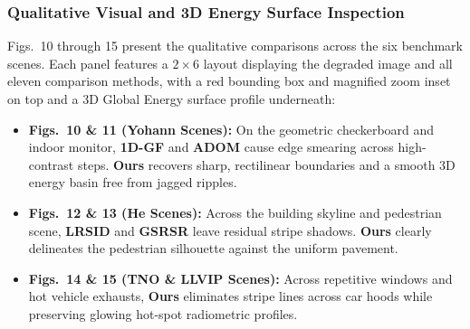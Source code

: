 \subsubsection{Qualitative Visual and 3D Energy Surface Inspection}
Figs.~10 through 15 present the qualitative comparisons across the six benchmark scenes. Each panel features a $2 \times 6$ layout displaying the degraded image and all eleven comparison methods, with a red bounding box and magnified zoom inset on top and a 3D Global Energy surface profile underneath:
\begin{itemize}
    \item \textbf{Figs.~10 \& 11 (Yohann Scenes):} On the geometric checkerboard and indoor monitor, \textbf{1D-GF} and \textbf{ADOM} cause edge smearing across high-contrast steps. \textbf{Ours} recovers sharp, rectilinear boundaries and a smooth 3D energy basin free from jagged ripples.
    \item \textbf{Figs.~12 \& 13 (He Scenes):} Across the building skyline and pedestrian scene, \textbf{LRSID} and \textbf{GSRSR} leave residual stripe shadows. \textbf{Ours} clearly delineates the pedestrian silhouette against the uniform pavement.
    \item \textbf{Figs.~14 \& 15 (TNO \& LLVIP Scenes):} Across repetitive windows and hot vehicle exhausts, \textbf{Ours} eliminates stripe lines across car hoods while preserving glowing hot-spot radiometric profiles.
\end{itemize}
